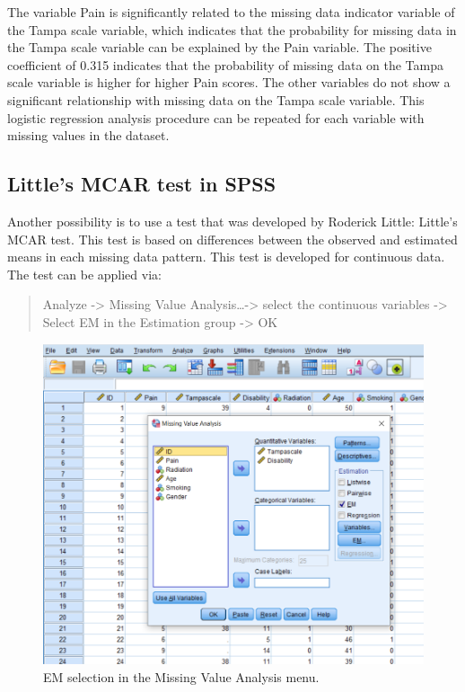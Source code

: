 \documentclass[
]{book}
\begin{document}
The variable Pain is significantly related to the missing data indicator variable of the Tampa scale variable, which indicates that the probability for missing data in the Tampa scale variable can be explained by the Pain variable. The positive coefficient of 0.315 indicates that the probability of missing data on the Tampa scale variable is higher for higher Pain scores. The other variables do not show a significant relationship with missing data on the Tampa scale variable. This logistic regression analysis procedure can be repeated for each variable with missing values in the dataset.

\hypertarget{littles-mcar-test-in-spss}{%
\subsection{Little's MCAR test in SPSS}\label{littles-mcar-test-in-spss}}

Another possibility is to use a test that was developed by Roderick Little: Little's MCAR test. This test is based on differences between the observed and estimated means in each missing data pattern. This test is developed for continuous data. The test can be applied via:

\begin{quote}
Analyze -\textgreater{} Missing Value Analysis\ldots-\textgreater{} select the continuous variables -\textgreater{} Select EM in the Estimation group -\textgreater{} OK
\end{quote}

\begin{figure}

{\centering \includegraphics[width=0.9\linewidth]{images/fig2.13} 

}

\caption{EM selection in the Missing Value Analysis menu.}\label{fig:fig2-12}
\end{figure}
\end{document}
